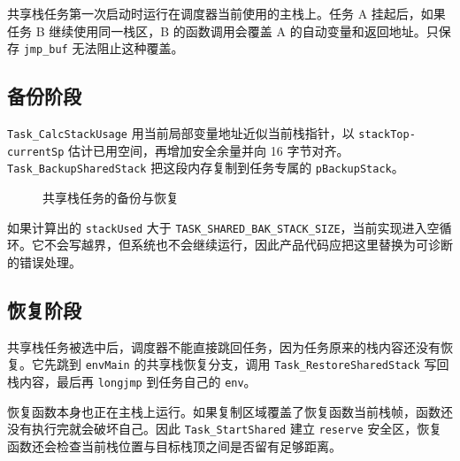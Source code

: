 共享栈任务第一次启动时运行在调度器当前使用的主栈上。任务 A 挂起后，如果任务 B 继续使用同一栈区，B 的函数调用会覆盖 A 的自动变量和返回地址。只保存 \texttt{jmp\_buf} 无法阻止这种覆盖。

\subsection{备份阶段}

\texttt{Task\_CalcStackUsage} 用当前局部变量地址近似当前栈指针，以 \texttt{stackTop-currentSp} 估计已用空间，再增加安全余量并向 16 字节对齐。\texttt{Task\_BackupSharedStack} 把这段内存复制到任务专属的 \texttt{pBackupStack}。

\begin{figure}[htbp]
\centering
{}
\caption{共享栈任务的备份与恢复} \label{fig:app-coro-shared-copy}
\end{figure}

如果计算出的 \texttt{stackUsed} 大于 \texttt{TASK\_SHARED\_BAK\_STACK\_SIZE}，当前实现进入空循环。它不会写越界，但系统也不会继续运行，因此产品代码应把这里替换为可诊断的错误处理。

\subsection{恢复阶段}

共享栈任务被选中后，调度器不能直接跳回任务，因为任务原来的栈内容还没有恢复。它先跳到 \texttt{envMain} 的共享栈恢复分支，调用 \texttt{Task\_RestoreSharedStack} 写回栈内容，最后再 \texttt{longjmp} 到任务自己的 \texttt{env}。

恢复函数本身也正在主栈上运行。如果复制区域覆盖了恢复函数当前栈帧，函数还没有执行完就会破坏自己。因此 \texttt{Task\_StartShared} 建立 \texttt{reserve} 安全区，恢复函数还会检查当前栈位置与目标栈顶之间是否留有足够距离。

